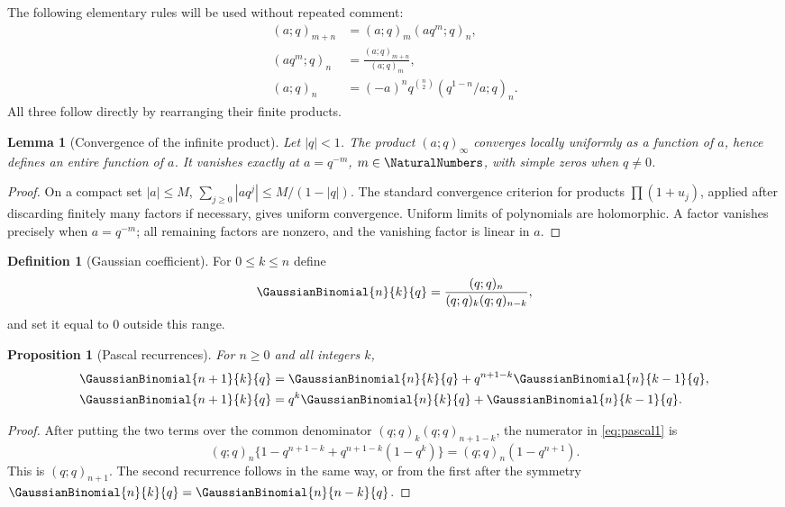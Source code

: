 \documentclass[11pt]{article}
\numberwithin{equation}{section}
\newtheorem{lemma}[theorem]{Lemma}
\newtheorem{proposition}[theorem]{Proposition}
\theoremstyle{definition}
\newtheorem{definition}[theorem]{Definition}
\theoremstyle{remark}
\begin{document}
The following elementary rules will be used without repeated comment:
\begin{align}
(a;q)_{m+n}&=(a;q)_m(aq^m;q)_n,\label{eq:split}\\
(aq^m;q)_n&=\frac{(a;q)_{m+n}}{(a;q)_m},\label{eq:shift}\\
(a;q)_n&=(-a)^nq^{\binom n2}(q^{1-n}/a;q)_n.\label{eq:reverse}
\end{align}
All three follow directly by rearranging their finite products.

\begin{lemma}[Convergence of the infinite product]\label{lem:prodconv}
Let $|q|<1$.  The product $(a;q)_\infty$ converges locally uniformly as a
function of $a$, hence defines an entire function of $a$.  It vanishes exactly
at $a=q^{-m}$, $m\in\NaturalNumbers$, with simple zeros when $q\ne0$.
\end{lemma}
\begin{proof}
On a compact set $|a|\le M$,
\(\sum_{j\ge0}|aq^j|\le M/(1-|q|)\).  The standard convergence criterion for
products $\prod(1+u_j)$, applied after discarding finitely many factors if
necessary, gives uniform convergence.  Uniform limits of polynomials are
holomorphic.  A factor vanishes precisely when $a=q^{-m}$; all remaining
factors are nonzero, and the vanishing factor is linear in $a$.
\end{proof}

\begin{definition}[Gaussian coefficient]
For $0\le k\le n$ define
\[
\GaussianBinomial{n}{k}{q}=\frac{(q;q)_n}{(q;q)_k(q;q)_{n-k}},
\]
and set it equal to $0$ outside this range.
\end{definition}

\begin{proposition}[Pascal recurrences]\label{prop:qpascal}
For $n\ge0$ and all integers $k$,
\begin{align}
\GaussianBinomial{n+1}{k}{q}&=\GaussianBinomial{n}{k}{q}+q^{n+1-k}\GaussianBinomial{n}{k-1}{q},\label{eq:pascal1}\\
\GaussianBinomial{n+1}{k}{q}&=q^k\GaussianBinomial{n}{k}{q}+\GaussianBinomial{n}{k-1}{q}.\label{eq:pascal2}
\end{align}
\end{proposition}
\begin{proof}
After putting the two terms over the common denominator
$(q;q)_k(q;q)_{n+1-k}$, the numerator in \eqref{eq:pascal1} is
\[
(q;q)_n\{1-q^{n+1-k}+q^{n+1-k}(1-q^k)\}
=(q;q)_n(1-q^{n+1}).
\]
This is $(q;q)_{n+1}$.  The second recurrence follows in the same way, or from
the first after the symmetry $\GaussianBinomial{n}{k}{q}=\GaussianBinomial{n}{n-k}{q}$.
\end{proof}
\end{document}
